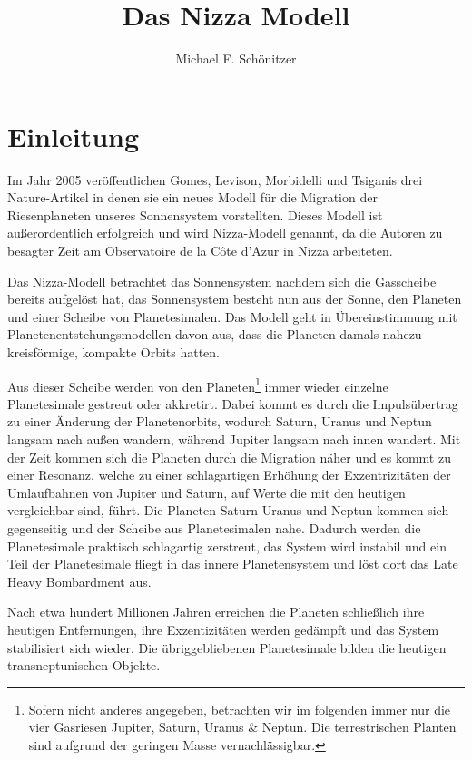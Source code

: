 \documentclass[10pt,a4paper,twoside]{article}
\author{Michael F. Schönitzer}
\title{Das Nizza Modell}
\begin{document}
\maketitle

\section{Einleitung}
Im Jahr 2005 veröffentlichen Gomes, Levison, Morbidelli und Tsiganis drei Nature-Artikel\cite{Gomes2005}\cite{Tsiganis2005}\cite{Morbidelli2005} %
in denen sie ein neues Modell für die Migration der Riesenplaneten unseres Sonnensystem vorstellten. Dieses Modell ist außerordentlich erfolgreich und wird Nizza-Modell genannt, da die Autoren zu besagter Zeit am Observatoire de la Côte d’Azur in Nizza arbeiteten.

Das Nizza-Modell betrachtet das Sonnensystem nachdem sich die Gasscheibe bereits aufgelöst hat, das Sonnensystem besteht nun aus der Sonne, den Planeten und einer Scheibe von Planetesimalen. Das Modell geht in Übereinstimmung mit Planetenentstehungsmodellen %
davon aus, dass die Planeten damals nahezu kreisförmige, kompakte Orbits hatten.

Aus dieser Scheibe werden von den Planeten\footnote{Sofern nicht anderes angegeben, betrachten wir im folgenden immer nur die vier Gasriesen Jupiter, Saturn, Uranus \& Neptun. Die terrestrischen Planten sind aufgrund der geringen Masse vernachlässigbar.} immer wieder einzelne Planetesimale gestreut oder akkretirt. %
Dabei kommt es durch die Impulsübertrag zu einer Änderung der Planetenorbits\cite{Tsiganis2005},
wodurch Saturn, Uranus und Neptun langsam nach außen wandern, während Jupiter langsam nach innen wandert\cite{Tsiganis2005}\cite{Hahn1999}. %
Mit der Zeit kommen sich die Planeten durch die Migration näher und es kommt zu einer Resonanz,
welche zu einer schlagartigen Erhöhung der Exzentrizitäten der Umlaufbahnen von Jupiter und Saturn, auf Werte die mit den heutigen vergleichbar sind, führt.
Die Planeten Saturn Uranus und Neptun kommen sich gegenseitig und der Scheibe aus Planetesimalen nahe. Dadurch werden die Planetesimale praktisch schlagartig zerstreut, das System wird instabil und ein Teil der Planetesimale fliegt in das innere Planetensystem und löst dort das Late Heavy Bombardment aus.

Nach etwa hundert Millionen Jahren erreichen die Planeten schließlich ihre heutigen Entfernungen, ihre Exzentizitäten werden gedämpft und das System stabilisiert sich wieder. Die übriggebliebenen Planetesimale bilden die heutigen transneptunischen Objekte.
\end{document}
